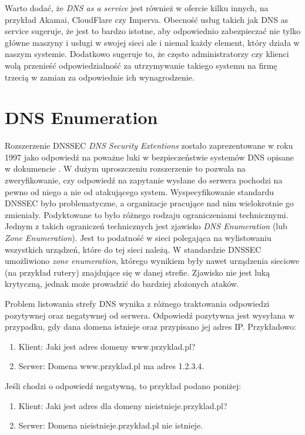 Warto dodać, że \textit{DNS as a service} jest również w ofercie kilku innych, na przykład Akamai\cite{akamai}, CloudFlare\cite{cloudflare} czy Imperva\cite{incapsula}. Obecność usług takich jak DNS as service sugeruje, że jest to bardzo istotne, aby odpowiednio zabezpieczać nie tylko główne maszyny i usługi w swojej sieci ale i niemal każdy element, który działa w naszym systemie. Dodatkowo sugeruje to, że często administratorzy czy klienci wolą przenieść odpowiedzialność za utrzymywanie takiego systemu na firmę trzecią w zamian za odpowiednie ich wynagrodzenie.

\section{DNS Enumeration}\label{zone_enumeration}
Rozszerzenie DNSSEC \textit{DNS Security Extentions} zostało zaprezentowane w roku 1997\cite{RFC2065} jako odpowiedź na poważne luki w bezpieczeństwie systemów DNS opisane w dokumencie \cite{DNSsecurityProblem}. W dużym uproszczeniu rozszerzenie to pozwala na zweryfikowanie, czy odpowiedź na zapytanie wysłane do serwera pochodzi na pewno od niego a nie od atakującego system. Wyspecyfikowanie standardu DNSSEC było problematyczne, a organizacje pracujące nad nim wielokrotnie go zmieniały. Podyktowane to było różnego rodzaju ograniczeniami technicznymi. Jednym z takich ograniczeń technicznych jest zjawisko \textit{DNS Enumeration} (lub \textit{Zone Enumeration}). Jest to podatność w sieci polegająca na wylistowaniu wszystkich urządzeń, które do tej sieci należą. W standardzie DNSSEC umożliwiono \textit{zone enumeration}, którego wynikiem były nawet urządzenia sieciowe (na przykład rutery) znajdujące się w danej strefie. Zjawisko nie jest luką krytyczną, jednak może prowadzić do bardziej złożonych ataków. 

Problem listowania strefy DNS wynika z różnego traktowania odpowiedzi pozytywnej oraz negatywnej od serwera. Odpowiedź pozytywna jest wysyłana w przypadku, gdy dana domena istnieje oraz przypisano jej adres IP. Przykładowo:
\begin{enumerate}
	\item Klient: Jaki jest adres domeny www.przyklad.pl?
	\item Serwer: Domena www.przyklad.pl ma adres 1.2.3.4.
\end{enumerate} 
Jeśli chodzi o odpowiedź negatywną, to przykład podano poniżej:
\begin{enumerate}
	\item Klient: Jaki jest adres dla domeny nieistnieje.przyklad.pl?
	\item Serwer: Domena nieistnieje.przykład.pl nie istnieje.
\end{enumerate}

